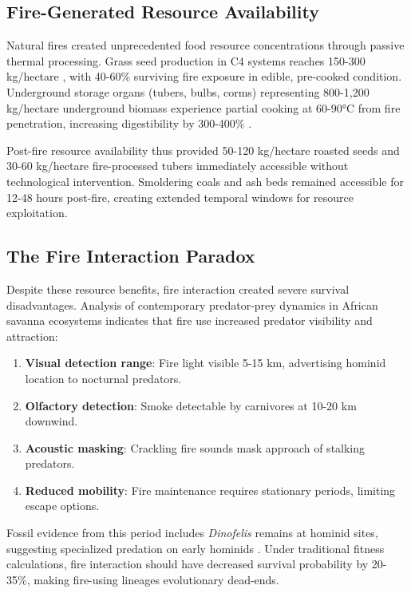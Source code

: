 \subsection{Fire-Generated Resource Availability}

Natural fires created unprecedented food resource concentrations through passive thermal processing. Grass seed production in C4 systems reaches 150-300 kg/hectare \citep{westoby2002plant}, with 40-60\% surviving fire exposure in edible, pre-cooked condition. Underground storage organs (tubers, bulbs, corms) representing 800-1,200 kg/hectare underground biomass experience partial cooking at 60-90°C from fire penetration, increasing digestibility by 300-400\% \citep{carmody2009energetic,wrangham2009catching}.

Post-fire resource availability thus provided 50-120 kg/hectare roasted seeds and 30-60 kg/hectare fire-processed tubers immediately accessible without technological intervention. Smoldering coals and ash beds remained accessible for 12-48 hours post-fire, creating extended temporal windows for resource exploitation.

\subsection{The Fire Interaction Paradox}

Despite these resource benefits, fire interaction created severe survival disadvantages. Analysis of contemporary predator-prey dynamics in African savanna ecosystems indicates that fire use increased predator visibility and attraction:

\begin{enumerate}
\item \textbf{Visual detection range}: Fire light visible 5-15 km, advertising hominid location to nocturnal predators.
\item \textbf{Olfactory detection}: Smoke detectable by carnivores at 10-20 km downwind.
\item \textbf{Acoustic masking}: Crackling fire sounds mask approach of stalking predators.
\item \textbf{Reduced mobility}: Fire maintenance requires stationary periods, limiting escape options.
\end{enumerate}

Fossil evidence from this period includes \textit{Dinofelis} remains at hominid sites, suggesting specialized predation on early hominids \citep{lewis2006carnivore}. Under traditional fitness calculations, fire interaction should have decreased survival probability by 20-35\%, making fire-using lineages evolutionary dead-ends.

